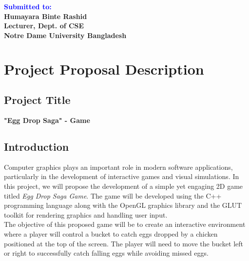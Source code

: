 \documentclass[12pt]{article}
\begin{document}
\begin{titlepage}
\begin{center}
    \vfill
    \begin{flushleft}
        \textbf{\Huge \textcolor{blue}{Submitted to:}} \\
        \vspace{0.3cm}
        \textbf{\Large Humayara Binte Rashid} \\
        \vspace{0.3cm}
        \textbf{\Large Lecturer, Dept. of CSE} \\
        \vspace{0.3cm}
        \textbf{\Large Notre Dame University Bangladesh}
    \end{flushleft}

\end{center}
\end{titlepage}


\rfoot{\thepage}
\tableofcontents
\thispagestyle{empty}
\clearpage

\pagestyle{fancy}
\fancyhf{}


\section{Project Proposal Description}

\subsection{Project Title}
\begin{center}
\textbf{"Egg Drop Saga" - Game}
\end{center}

\subsection{Introduction}

Computer graphics plays an important role in modern software applications, particularly in the development of interactive games and visual simulations. In this project, we will propose the development of a simple yet engaging 2D game titled \textit{Egg Drop Saga Game}. The game will be developed using the C++ programming language along with the OpenGL graphics library and the GLUT toolkit for rendering graphics and handling user input.\\
The objective of this proposed game will be to create an interactive environment where a player will control a bucket to catch eggs dropped by a chicken positioned at the top of the screen. The player will need to move the bucket left or right to successfully catch falling eggs while avoiding missed eggs.
\end{document}

